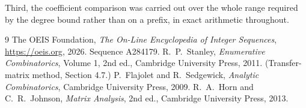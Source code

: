 \documentclass[11pt,a4paper]{article}
\theoremstyle{plain}
\theoremstyle{definition}
\begin{document}
Third, the coefficient comparison was carried out over the whole range required by the degree
bound rather than on a prefix, in exact arithmetic throughout.

\begin{thebibliography}{9}
 The OEIS Foundation, \emph{The On-Line Encyclopedia of Integer
Sequences}, \url{https://oeis.org}, 2026. Sequence A284179.
 R.~P.~Stanley, \emph{Enumerative Combinatorics}, Volume 1, 2nd ed.,
Cambridge University Press, 2011. (Transfer-matrix method, Section 4.7.)
 P.~Flajolet and R.~Sedgewick, \emph{Analytic Combinatorics}, Cambridge
University Press, 2009.
 R.~A.~Horn and C.~R.~Johnson, \emph{Matrix Analysis}, 2nd ed., Cambridge
University Press, 2013.
\end{thebibliography}
\end{document}
